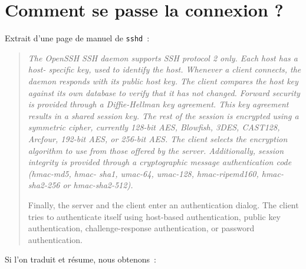\documentclass[a4paper,11pt]{article}
\begin{document}
\section{Comment se passe la connexion ?}
\label{comment-se-passe-la-connexion}

Extrait d'une page de manuel de \texttt{sshd}~:

\begin{quote}

	\it\small
	The OpenSSH SSH daemon supports SSH protocol 2 only.  Each host has a host-
	specific key, used to identify the host.  Whenever a client connects, the
	daemon responds with its public host key.  The client compares the host
	key against its own database to verify that it has not changed.  Forward
	security is provided through a Diffie-Hellman key agreement.  This key
	agreement results in a shared session key.  The rest of the session is
	encrypted using a symmetric cipher, currently 128-bit AES, Blowfish, 3DES,
	CAST128, Arcfour, 192-bit AES, or 256-bit AES.  The client selects the
	encryption algorithm to use from those offered by the server.  Additionally,
	session integrity is provided through a cryptographic message
	authentication code (hmac-md5, hmac- sha1, umac-64, umac-128,
	hmac-ripemd160, hmac-sha2-256 or hmac-sha2-512).
 
	Finally, the server and the client enter an authentication dialog.  The
	client tries to authenticate itself using host-based authentication, public
	key authentication, challenge-response authentication, or password
	authentication.
	
\end{quote}

Si l'on traduit et résume, nous obtenons~:
\end{document}
